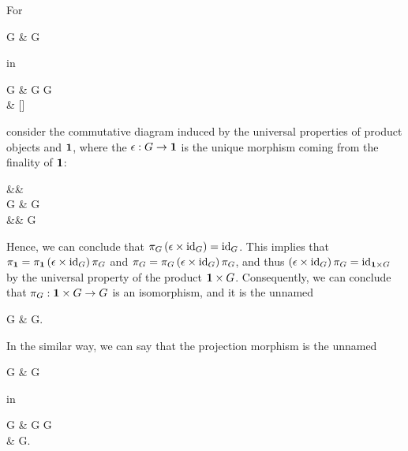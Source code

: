 {    For
    \begin{inlinecd}[shorten <>=0pt]
        \one \times G \ar[r, "\cong"] \& G
    \end{inlinecd}
    in
    \begin{cd}[shorten <>=0pt, column sep=3em]
        \one \times G \ar[r, "e \times \id{G}"]  \& G \times G \ar[d, "m"] \\
        \& []
    \end{cd}
    consider the commutative diagram induced by the universal properties of product objects and $\one$, where the $\epsilon : G \to \one$ is the unique morphism coming from the finality of $\one$:
    \begin{cd}[row sep=0.8em, column sep=4em]
        \&\& \one \\
        G    \& \one \times G \ar[ru, "\pi_1", swap] \ar[rd, "\pi_G"]\\
        \&\& G
    \end{cd}
    Hence, we can conclude that $\pi_G \left(\epsilon \times \mathrm{id}_{G}\right) = \mathrm{id}_{G}$.
    This implies that $\pi_{\one} = \pi_{\one} \left(\epsilon \times \id{G}\right) \pi_G$ and $\pi_G = \pi_G \left(\epsilon \times \mathrm{id}_{G}\right) \pi_G$, and thus $\left(\epsilon \times \id{G}\right) \pi_G = \id{\one \times G}$ by the universal property of the product $\one \times G$.
    Consequently, we can conclude that $\pi_G : \one \times G \to G$ is an isomorphism, and it is the unnamed
    \begin{inlinecd}[shorten <>=0pt]
        \one \times G \ar[r, "\cong"] \& G.
    \end{inlinecd}

    In the similar way, we can say that the projection morphism is the unnamed
    \begin{inlinecd}[shorten <>=0pt]
        G \times \one \ar[r, "\cong"] \& G
    \end{inlinecd}
    in
    \begin{cd}[shorten <>=0pt, column sep=3em]
        G \times \one \ar[r, "\id{G} \times e"]  \& G \times G \ar[d, "m"] \\
        \& G.
    \end{cd}
}
\clearpage

